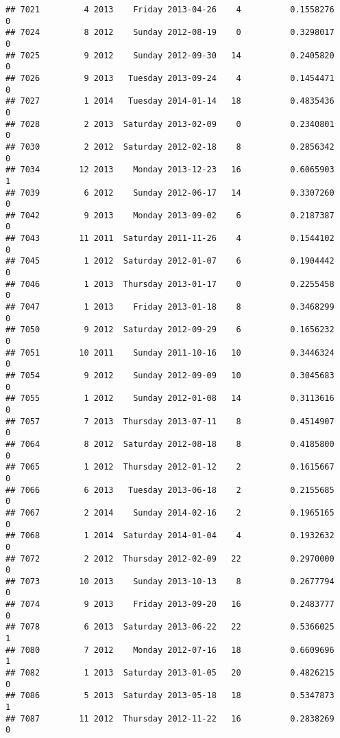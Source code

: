 \documentclass[
]{article}
\begin{document}
\begin{verbatim}
## 7021         4 2013    Friday 2013-04-26    4          0.1558276             0
## 7024         8 2012    Sunday 2012-08-19    0          0.3298017             0
## 7025         9 2012    Sunday 2012-09-30   14          0.2405820             0
## 7026         9 2013   Tuesday 2013-09-24    4          0.1454471             0
## 7027         1 2014   Tuesday 2014-01-14   18          0.4835436             0
## 7028         2 2013  Saturday 2013-02-09    0          0.2340801             0
## 7030         2 2012  Saturday 2012-02-18    8          0.2856342             0
## 7034        12 2013    Monday 2013-12-23   16          0.6065903             1
## 7039         6 2012    Sunday 2012-06-17   14          0.3307260             0
## 7042         9 2013    Monday 2013-09-02    6          0.2187387             0
## 7043        11 2011  Saturday 2011-11-26    4          0.1544102             0
## 7045         1 2012  Saturday 2012-01-07    6          0.1904442             0
## 7046         1 2013  Thursday 2013-01-17    0          0.2255458             0
## 7047         1 2013    Friday 2013-01-18    8          0.3468299             0
## 7050         9 2012  Saturday 2012-09-29    6          0.1656232             0
## 7051        10 2011    Sunday 2011-10-16   10          0.3446324             0
## 7054         9 2012    Sunday 2012-09-09   10          0.3045683             0
## 7055         1 2012    Sunday 2012-01-08   14          0.3113616             0
## 7057         7 2013  Thursday 2013-07-11    8          0.4514907             0
## 7064         8 2012  Saturday 2012-08-18    8          0.4185800             0
## 7065         1 2012  Thursday 2012-01-12    2          0.1615667             0
## 7066         6 2013   Tuesday 2013-06-18    2          0.2155685             0
## 7067         2 2014    Sunday 2014-02-16    2          0.1965165             0
## 7068         1 2014  Saturday 2014-01-04    4          0.1932632             0
## 7072         2 2012  Thursday 2012-02-09   22          0.2970000             0
## 7073        10 2013    Sunday 2013-10-13    8          0.2677794             0
## 7074         9 2013    Friday 2013-09-20   16          0.2483777             0
## 7078         6 2013  Saturday 2013-06-22   22          0.5366025             1
## 7080         7 2012    Monday 2012-07-16   18          0.6609696             1
## 7082         1 2013  Saturday 2013-01-05   20          0.4826215             0
## 7086         5 2013  Saturday 2013-05-18   18          0.5347873             1
## 7087        11 2012  Thursday 2012-11-22   16          0.2838269             0

\end{verbatim}
\end{document}
